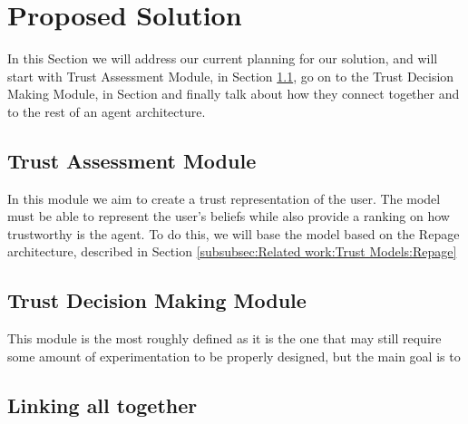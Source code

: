 \section{Proposed Solution}
\label{sec:Solution}
In this Section we will address our current planning for our solution, and will start with Trust Assessment Module, in Section \ref{subsec:Solution:Trust Assessment Module}, go on to the Trust Decision Making Module, in Section and finally talk about how they connect together and to the rest of an agent architecture.


\subsection{Trust Assessment Module}
\label{subsec:Solution:Trust Assessment Module}
In this module we aim to create a trust representation of the user. The model must be able to represent the user's beliefs while also provide a ranking on how trustworthy is the agent. To do this, we will base the model based on the Repage architecture, described in Section \ref{subsubsec:Related work:Trust Models:Repage}



\subsection{Trust Decision Making Module}
\label{subsec:Solution:Trust Decision Making Module}
This module is the most roughly defined as it is the one that may still require some amount of experimentation to be properly designed, but the main goal is to 


\subsection{Linking all together}
\label{subsec:Solution:Linking all together}
